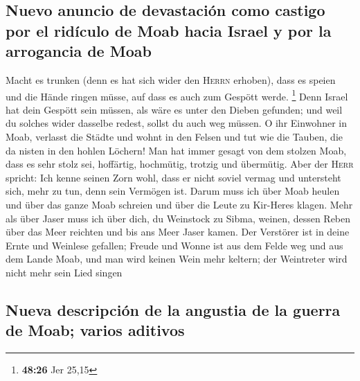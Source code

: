 \hypertarget{nuevo-anuncio-de-devastaciuxf3n-como-castigo-por-el-riduxedculo-de-moab-hacia-israel-y-por-la-arrogancia-de-moab}{%
\subsection{Nuevo anuncio de devastación como castigo por el ridículo de
Moab hacia Israel y por la arrogancia de
Moab}\label{nuevo-anuncio-de-devastaciuxf3n-como-castigo-por-el-riduxedculo-de-moab-hacia-israel-y-por-la-arrogancia-de-moab}}

 Macht es trunken (denn es hat sich wider den
\textsc{Herrn} erhoben), dass es speien und die Hände ringen müsse, auf
dass es auch zum Gespött werde. \footnote{\textbf{48:26} Jer 25,15}
 Denn Israel hat dein Gespött sein müssen, als wäre es
unter den Dieben gefunden; und weil du solches wider dasselbe redest,
sollst du auch weg müssen.  O ihr Einwohner in Moab,
verlasst die Städte und wohnt in den Felsen und tut wie die Tauben, die
da nisten in den hohlen Löchern!  Man hat immer gesagt
von dem stolzen Moab, dass es sehr stolz sei, hoffärtig, hochmütig,
trotzig und übermütig.  Aber der \textsc{Herr} spricht:
Ich kenne seinen Zorn wohl, dass er nicht soviel vermag und untersteht
sich, mehr zu tun, denn sein Vermögen ist.  Darum muss
ich über Moab heulen und über das ganze Moab schreien und über die Leute
zu Kir-Heres klagen.  Mehr als über Jaser muss ich über
dich, du Weinstock zu Sibma, weinen, dessen Reben über das Meer reichten
und bis ans Meer Jaser kamen. Der Verstörer ist in deine Ernte und
Weinlese gefallen;  Freude und Wonne ist aus dem Felde
weg und aus dem Lande Moab, und man wird keinen Wein mehr keltern; der
Weintreter wird nicht mehr sein Lied singen

\hypertarget{nueva-descripciuxf3n-de-la-angustia-de-la-guerra-de-moab-varios-aditivos}{%
\subsection{Nueva descripción de la angustia de la guerra de Moab;
varios
aditivos}\label{nueva-descripciuxf3n-de-la-angustia-de-la-guerra-de-moab-varios-aditivos}}

